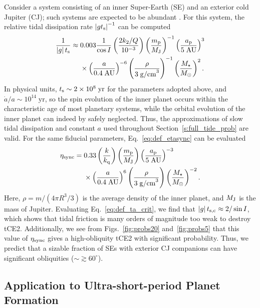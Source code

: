 \documentclass[
        fleqn,
        usenatbib,
    ]{mnras}
\newcommand*{\abs}[1]{\left|#1\right|}
\newcommand*{\p}[1]{\left(#1\right)}
\begin{document}
Consider a system consisting of an inner Super-Earth (SE) and an exterior cold
Jupiter (CJ); such systems are expected to be abundant \citep{zhu2018super}. For
this system, the relative tidal dissipation rate $\abs{gt_{\rm s}}^{-1}$ can be
computed
\begin{align}
    \frac{1}{\abs{g} t_{\rm s}}
        \approx{}& 0.003\frac{1}{\cos I}\p{\frac{2k_2/Q}{10^{-3}}}
            \p{\frac{m_{\rm p}}{M_{\rm J}}}^{-1}
            \p{\frac{a_{\rm p}}{5 \;\mathrm{AU}}}^{3}\nonumber\\
        &\times \p{\frac{a}{0.4\;\mathrm{AU}}}^{-6}
            \p{\frac{\rho}{3 \; \mathrm{g/cm}^3}}^{-1}
            \p{\frac{M_\star}{M_{\odot}}}^{2}.
\end{align}
In physical units, $t_{\rm s} \sim 2 \times 10^8\;\mathrm{yr}$ for the
parameters adopted above, and $\dot{a} / a \sim 10^{14}\;\mathrm{yr}$, so the
spin evolution of the inner planet occurs within the characteristic age of most
planetary systems, while the orbital evolution of the inner planet can indeed by
safely neglected. Thus, the approximations of slow tidal dissipation and
constant $a$ used throughout Section~\ref{s:full_tide_prob} are valid.
For the same fiducial parameters, Eq.~\eqref{eq:def_etasync} can be evaluated
\begin{align}
    \eta_{\rm sync} ={}& 0.33 \p{\frac{k}{k_{\rm q}}}
            \p{\frac{m_{\rm p}}{M_{\rm J}}}
            \p{\frac{a_{\rm p}}{5 \;\mathrm{AU}}}^{-3}\nonumber\\
        &\times \p{\frac{a}{0.4\;\mathrm{AU}}}^{6}
            \p{\frac{\rho}{3 \; \mathrm{g/cm}^3}}
            \p{\frac{M_\star}{M_{\odot}}}^{-2}.\label{eq:sehj_etasync}
\end{align}
Here, $\rho = m / \p{4\pi R^3/3}$ is the average density of the inner planet,
and $M_{\rm J}$ is the mass of Jupiter. Evaluating Eq.~\eqref{eq:def_ta_crit},
we find that $\abs{g}t_{\rm s, c} \approx 2 / \sin I$, which shows that tidal
friction is many orders of magnitude too weak to destroy tCE2. Additionally,
we see from Figs.~\ref{fig:probs20} and~\ref{fig:probs5} that this value of
$\eta_{\rm sync}$ gives a high-obliquity tCE2 with significant probability.
Thus, we predict that a sizable fraction of SEs with exterior CJ companions can
have significant obliquities ($\sim \gtrsim 60^\circ$).

\subsection{Application to Ultra-short-period Planet Formation
}\label{ss:disc_usp}
\end{document}
